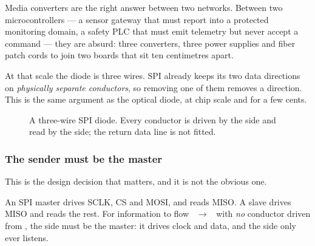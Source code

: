 \documentclass[11pt,a4paper]{article}
\begin{document}
Media converters are the right answer between two networks. Between two
microcontrollers --- a sensor gateway that must report into a protected
monitoring domain, a safety PLC that must emit telemetry but never accept a
command --- they are absurd: three converters, three power supplies and fiber
patch cords to join two boards that sit ten centimetres apart.

At that scale the diode is three wires. SPI already keeps its two data
directions on \emph{physically separate conductors}, so removing one of them
removes a direction. This is the same argument as the optical diode, at chip
scale and for a few cents.

\begin{figure}[h]
\centering
{}
\caption{A three-wire SPI diode. Every conductor is driven by the \srcside{}
         side and read by the \dstside{} side; the return data line is not
         fitted.}
\label{fig:spi}
\end{figure}

\subsubsection{The sender must be the master}

This is the design decision that matters, and it is not the obvious one.

An SPI master drives SCLK, CS and MOSI, and reads MISO. A slave drives MISO
and reads the rest. For information to flow \srcside{}~$\rightarrow$~\dstside{}
with \emph{no} conductor driven from \dstside{}, the \srcside{} side must be
the master: it drives clock and data, and the \dstside{} side only ever
listens.
\end{document}
